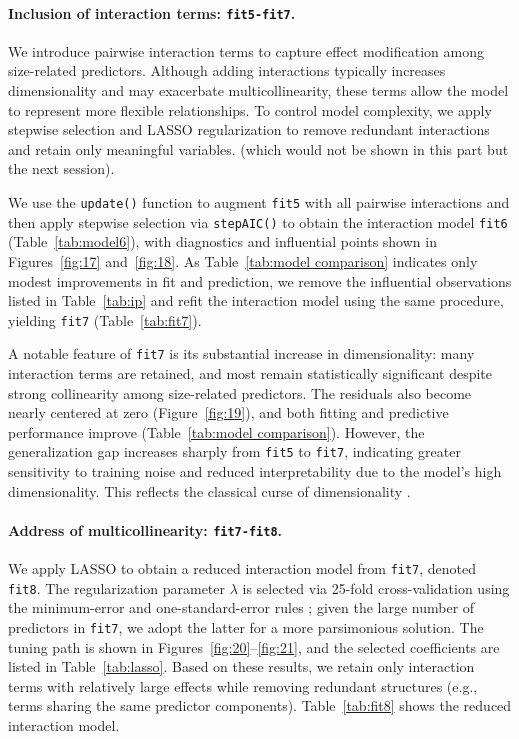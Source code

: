 \documentclass[12pt]{article}
\begin{document}
	\paragraph{Inclusion of interaction terms: \texttt{fit5-fit7}.} We introduce pairwise interaction terms to capture effect modification among size-related predictors. Although adding interactions typically increases dimensionality and may exacerbate multicollinearity, these terms allow the model to represent more flexible relationships. To control model complexity, we apply stepwise selection and LASSO regularization to remove redundant interactions and retain only meaningful variables. (which would not be shown in this part but the next session).
	
	We use the \texttt{update()} function to augment \texttt{fit5} with all pairwise interactions and then apply stepwise selection via \texttt{stepAIC()} to obtain the interaction model \texttt{fit6} (Table~\ref{tab:model6}), with diagnostics and influential points shown in Figures~\ref{fig:17} and~\ref{fig:18}. As Table~\ref{tab:model comparison} indicates only modest improvements in fit and prediction, we remove the influential observations listed in Table~\ref{tab:ip} and refit the interaction model using the same procedure, yielding \texttt{fit7} (Table~\ref{tab:fit7}).
	
	A notable feature of \texttt{fit7} is its substantial increase in dimensionality: many interaction terms are retained, and most remain statistically significant despite strong collinearity among size-related predictors. The residuals also become nearly centered at zero (Figure~\ref{fig:19}), and both fitting and predictive performance improve (Table~\ref{tab:model comparison}). However, the generalization gap increases sharply from \texttt{fit5} to \texttt{fit7}, indicating greater sensitivity to training noise and reduced interpretability due to the model’s high dimensionality. This reflects the classical curse of dimensionality \citep{bellman1961adaptive}.
	
	\paragraph{Address of multicollinearity: \texttt{fit7-fit8}.} We apply LASSO to obtain a reduced interaction model from \texttt{fit7}, denoted \texttt{fit8}. The regularization parameter $\lambda$ is selected via 25-fold cross-validation using the minimum-error and one-standard-error rules \citep{hastie2009elements}; given the large number of predictors in \texttt{fit7}, we adopt the latter for a more parsimonious solution. The tuning path is shown in Figures~\ref{fig:20}–\ref{fig:21}, and the selected coefficients are listed in Table~\ref{tab:lasso}. Based on these results, we retain only interaction terms with relatively large effects while removing redundant structures (e.g., terms sharing the same predictor components).  Table~\ref{tab:fit8} shows the reduced interaction model.
	
\end{document}
